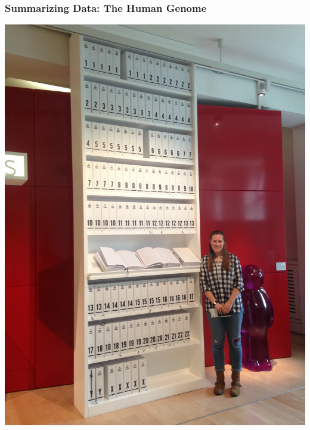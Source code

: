 \documentclass[12pt, 
hyperref={colorlinks=true, linkcolor=blue, urlcolor=cyan}]{beamer}
\begin{document}
\begin{frame}
\frametitle{Summarizing Data: The Human Genome}
\vspace{-0.5cm}
\center \includegraphics[height=0.65\textheight, angle = 270]{./bookcase}
\end{frame}
\end{document}
